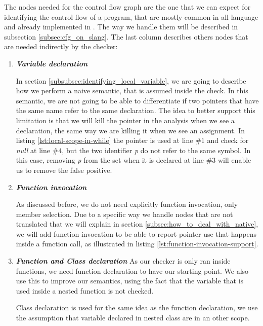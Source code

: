 The nodes needed for the control flow graph are the one that we can expect for identifying the control flow of a program, that are mostly common in all language and already implemented in \slang{}. 
The way we handle them will be described in subsection \ref{subsec:cfg_on_slang}.
The last column describes others nodes that are needed indirectly by the checker:
\begin{enumerate}
	\item \textbf{\textit{Variable declaration}} \newline
	
	
	In section \ref{subsubsec:identifying_local_variable}, we are going to describe how we perform a naive semantic, that is assumed inside the check.
	In this semantic, we are not going to be able to differentiate if two pointers that have the same name refer to the same declaration.
	The idea to better support this limitation is that we will kill the pointer in the analysis when we see a declaration, the same way we are killing it when we see an assignment.
	In listing \ref{lst:local-scope-in-while} the pointer is used at line $\#1$ and check for \emph{null} at line $\#4$, but the two identifier \emph{p} do not refer to the same symbol.
	In this case, removing \emph{p} from the set when it is declared at line $\#3$ will enable us to remove the false positive.

	\item \textbf{\textit{Function invocation}} \newline
	
	
	As discussed before, we do not need explicitly function invocation, only member selection. 
	Due to a specific way we handle nodes that are not translated that we will explain in section \ref{subsec:how_to_deal_with_native}, we will add function invocation to be able to report pointer use that happens inside a function call, as illustrated in listing \ref{lst:function-invocation-support}.
	
	\item \textbf{\textit{Function and Class declaration}} \newline
	As our checker is only ran inside functions, we need function declaration to have our starting point. 
	We also use this to improve our semantics, using the fact that the variable that is used inside a nested function is not checked.
	
	Class declaration is used for the same idea as the function declaration, we use the assumption that variable declared in nested class are in an other scope.
\end{enumerate}

